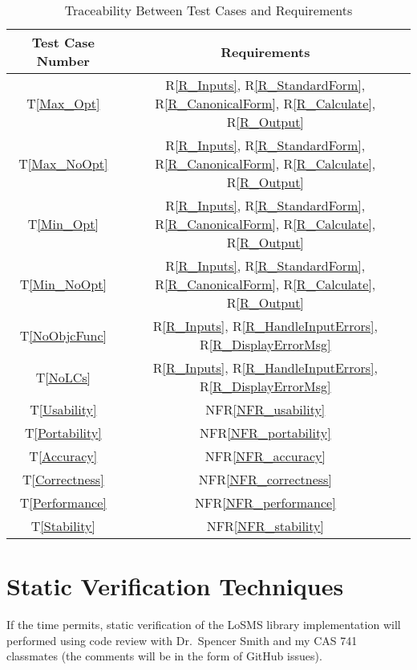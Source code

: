 \documentclass[12pt, titlepage]{article}
\newcommand{\famname}{LoSMS}
\begin{document}
\begin{table} [h!]
	\centering
	\begin{tabular}{|c|c|}
		\hline	
		\textbf{Test Case Number} & \textbf{Requirements}\\
		\hline 
		T\ref{Max_Opt}& R\ref{R_Inputs}, R\ref{R_StandardForm}, 
		R\ref{R_CanonicalForm}, R\ref{R_Calculate}, R\ref{R_Output}\\ \hline
		T\ref{Max_NoOpt}& R\ref{R_Inputs}, R\ref{R_StandardForm}, 
		R\ref{R_CanonicalForm}, R\ref{R_Calculate}, R\ref{R_Output}\\ \hline
		T\ref{Min_Opt}& R\ref{R_Inputs}, R\ref{R_StandardForm}, 
		R\ref{R_CanonicalForm}, R\ref{R_Calculate}, R\ref{R_Output}\\ \hline
		T\ref{Min_NoOpt}& R\ref{R_Inputs}, R\ref{R_StandardForm}, 
		R\ref{R_CanonicalForm}, R\ref{R_Calculate}, R\ref{R_Output}\\ \hline
		T\ref{NoObjcFunc}& R\ref{R_Inputs}, R\ref{R_HandleInputErrors}, 
		R\ref{R_DisplayErrorMsg}\\ \hline
		T\ref{NoLCs}& R\ref{R_Inputs}, R\ref{R_HandleInputErrors}, 
		R\ref{R_DisplayErrorMsg}\\ \hline
		T\ref{Usability}& NFR\ref{NFR_usability}\\ \hline
		T\ref{Portability}& NFR\ref{NFR_portability}\\ \hline
		T\ref{Accuracy}& NFR\ref{NFR_accuracy}\\ \hline
		T\ref{Correctness}& NFR\ref{NFR_correctness}\\ \hline
		T\ref{Performance}& NFR\ref{NFR_performance}\\ \hline
		T\ref{Stability}& NFR\ref{NFR_stability}\\ \hline
	\end{tabular}
	\caption{Traceability Between Test Cases and Requirements}
	\label{Table:TraceabilityTandR} 
\end{table}

\FloatBarrier

\section{Static Verification Techniques} \label{StaticVerTechniques}

If the time permits, static verification of the \famname{} library 
implementation will performed using code review with Dr.~Spencer Smith and my 
CAS 741 classmates (the comments will be in the form of GitHub issues).
\end{document}
